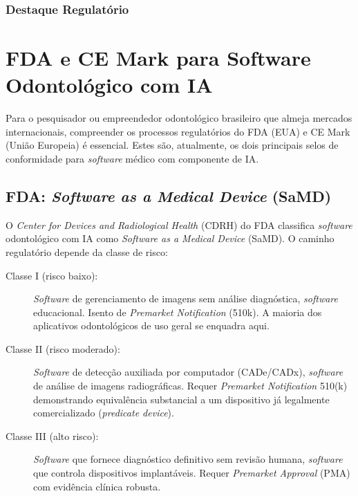 \subsubsection{Destaque Regulatório}



\section{FDA e CE Mark para Software Odontológico com IA}
\label{sec:fda-ce-mark}

\nivelcinco

Para o pesquisador ou empreendedor odontológico brasileiro que almeja
mercados internacionais, compreender os processos regulatórios do FDA (EUA) e
CE Mark (União Europeia) é essencial. Estes são, atualmente, os dois principais
selos de conformidade para \textit{software} médico com componente de IA.

 

\subsection{FDA: \textit{Software as a Medical Device} (SaMD)}

O \textit{Center for Devices and Radiological Health} (CDRH) do FDA classifica
\textit{software} odontológico com IA como \textit{Software as a Medical Device}
(SaMD). O caminho regulatório depende da classe de risco:

\begin{description}
  \item[Classe I (risco baixo):] \textit{Software} de gerenciamento de imagens
    sem análise diagnóstica, \textit{software} educacional. Isento de
    \textit{Premarket Notification} (510k). A maioria dos aplicativos
    odontológicos de uso geral se enquadra aqui.

  \item[Classe II (risco moderado):] \textit{Software} de detecção auxiliada
    por computador (CADe/CADx), \textit{software} de análise de imagens
    radiográficas. Requer \textit{Premarket Notification} 510(k) demonstrando
    equivalência substancial a um dispositivo já legalmente comercializado
    (\textit{predicate device}).

  \item[Classe III (alto risco):] \textit{Software} que fornece diagnóstico
    definitivo sem revisão humana, \textit{software} que controla dispositivos
    implantáveis. Requer \textit{Premarket Approval} (PMA) com evidência
    clínica robusta.
\end{description}

